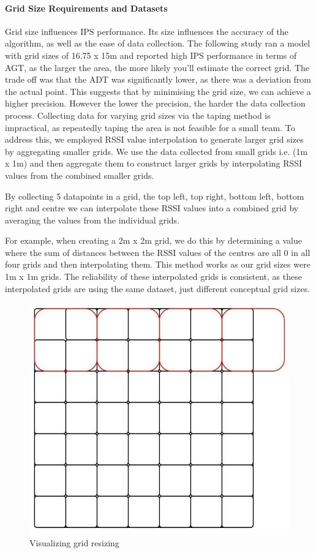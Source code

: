 \documentclass[runningheads]{llncs}
\begin{document}
\paragraph{Grid Size Requirements and Datasets} Grid size influences IPS performance. Its size influences the accuracy of the algorithm, as well as the ease of data collection. The following study \cite{LRE1} ran a model with grid sizes of 16.75 x 15m and reported high IPS performance in terms of AGT, as the larger the area, the more likely you’ll estimate the correct grid. The trade off was that the ADT was significantly lower, as there was a deviation from the actual point. This suggests that by minimising the grid size, we can achieve a higher precision. However the lower the precision, the harder the data collection process. 
Collecting data for varying grid sizes via the taping method is impractical, as repeatedly taping the area is not feasible for a small team. To address this, we employed RSSI value interpolation to generate larger grid sizes by aggregating smaller grids. We use the data collected from small grids i.e. (1m x 1m) and then aggregate them to construct larger grids by interpolating RSSI values from the combined smaller grids.

By collecting 5 datapoints in a grid, the top left, top right, bottom left, bottom right and centre we can interpolate these RSSI values into a combined grid by averaging the values from the individual grids.

For example, when creating a 2m x 2m grid, we do this by determining a value where the sum of distances between the RSSI values of the centres are all 0 in all four grids and then interpolating them. This method works as our grid sizes were 1m x 1m grids. The reliability of these interpolated grids is consistent, as these interpolated grids are using the same dataset, just different conceptual grid sizes.

\begin{figure}[htbp]
	\centerline{\includegraphics[scale=0.5]{image14.jpg}}
	\caption{Visualizing grid resizing}
	\label{fig:vis_grid_resize}
\end{figure}
\end{document}
